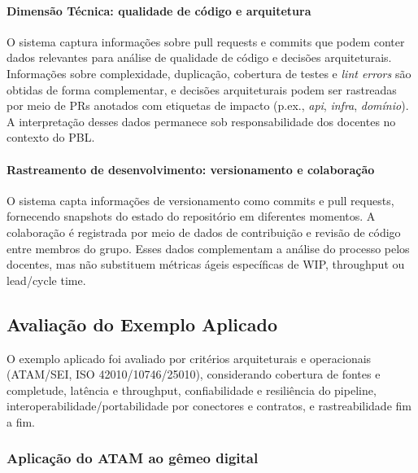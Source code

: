 \documentclass[12pt,a4paper]{article}
\begin{document}
\paragraph{Dimensão Técnica: qualidade de código e arquitetura}
O sistema captura informações sobre pull requests e commits que podem conter dados relevantes para análise de qualidade de código e decisões arquiteturais. Informações sobre complexidade, duplicação, cobertura de testes e \textit{lint errors} são obtidas de forma complementar, e decisões arquiteturais podem ser rastreadas por meio de PRs anotados com etiquetas de impacto (p.ex., \textit{api}, \textit{infra}, \textit{domínio}). A interpretação desses dados permanece sob responsabilidade dos docentes no contexto do PBL.

\paragraph{Rastreamento de desenvolvimento: versionamento e colaboração}
O sistema capta informações de versionamento como commits e pull requests, fornecendo snapshots do estado do repositório em diferentes momentos. A colaboração é registrada por meio de dados de contribuição e revisão de código entre membros do grupo. Esses dados complementam a análise do processo pelos docentes, mas não substituem métricas ágeis específicas de WIP, throughput ou lead/cycle time.


\subsection{Avaliação do Exemplo Aplicado}

O exemplo aplicado foi avaliado por critérios arquiteturais e operacionais (ATAM/SEI, ISO 42010/10746/25010), considerando cobertura de fontes e completude, latência e throughput, confiabilidade e resiliência do pipeline, interoperabilidade/portabilidade por conectores e contratos, e rastreabilidade fim a fim.

\subsubsection{Aplicação do ATAM ao gêmeo digital}
\end{document}
